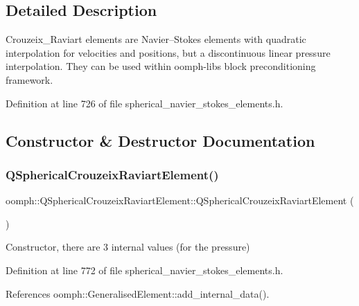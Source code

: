 \subsection{Detailed Description}
Crouzeix\+\_\+\+Raviart elements are Navier--Stokes elements with quadratic interpolation for velocities and positions, but a discontinuous linear pressure interpolation. They can be used within oomph-\/lib\textquotesingle{}s block preconditioning framework. 

Definition at line 726 of file spherical\+\_\+navier\+\_\+stokes\+\_\+elements.\+h.



\subsection{Constructor \& Destructor Documentation}
\mbox{\label{classoomph_1_1QSphericalCrouzeixRaviartElement_aab094422f825d629e91cea28c87284b3}} 
\subsubsection{\texorpdfstring{Q\+Spherical\+Crouzeix\+Raviart\+Element()}{QSphericalCrouzeixRaviartElement()}}
{\footnotesize\ttfamily oomph\+::\+Q\+Spherical\+Crouzeix\+Raviart\+Element\+::\+Q\+Spherical\+Crouzeix\+Raviart\+Element (\begin{DoxyParamCaption}{ }\end{DoxyParamCaption})\hspace{0.3cm}{\ttfamily [inline]}}



Constructor, there are 3 internal values (for the pressure) 



Definition at line 772 of file spherical\+\_\+navier\+\_\+stokes\+\_\+elements.\+h.



References oomph\+::\+Generalised\+Element\+::add\+\_\+internal\+\_\+data().



